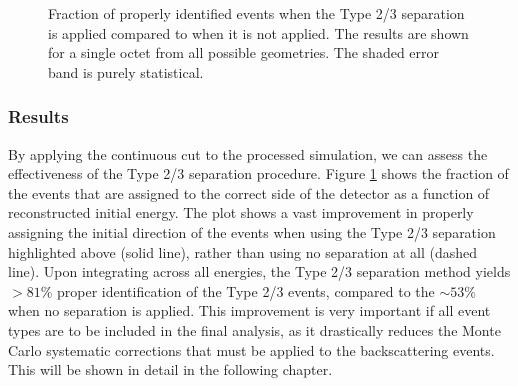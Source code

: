 \begin{figure}[h]
  \caption{Fraction of properly identified events when the Type 2/3
    separation is applied compared to when it is not applied. The results are shown for a single octet from all possible
    geometries. The shaded error band is purely statistical.}
  \label{fig:sepResults}
\end{figure}

\subsubsection{Results}

By applying the continuous cut to the processed simulation, we can assess the
effectiveness of the Type 2/3 separation procedure. 
Figure \ref{fig:sepResults} shows the fraction of the events that are assigned to the correct
side of the detector as a function of reconstructed initial energy. The plot shows a vast improvement in
properly assigning the initial direction of the events when using the Type 2/3 separation
highlighted above (solid line), rather than using no separation at all (dashed line).
Upon integrating across all energies, the Type 2/3 separation method yields $>81\%$ proper identification
of the Type 2/3 events,
compared to the $\sim53\%$
when no separation is applied. This improvement is very important if all event types
are to be included in the final analysis, as it drastically reduces the
Monte Carlo systematic corrections that must be applied to the backscattering events.
This will be shown in detail in the following chapter.










